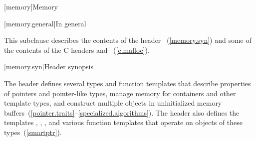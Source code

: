 [memory]{Memory}

[memory.general]{In general}

\pnum
This subclause describes the contents of the header
~(\ref{memory.syn}) and some
of the contents of the C headers  and
~(\ref{c.malloc}).

[memory.syn]{Header  synopsis}

\pnum
The header  defines several types and function templates that
describe properties of pointers and pointer-like types, manage memory
for containers and other template types, and construct multiple objects in
uninitialized memory
buffers~(\ref{pointer.traits}--\ref{specialized.algorithms}).
The header also defines the templates
, , , and various function
templates that operate on objects of these types~(\ref{smartptr}).

